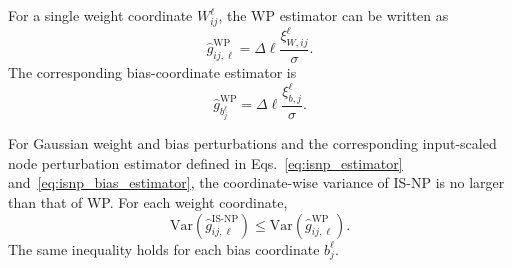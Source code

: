 For a single weight coordinate \(W^\ell_{ij}\), the WP estimator can be written as
\begin{equation}
\widehat{g}^{\mathrm{WP}}_{ij,\ell}
=
\Delta \ell
\frac{\xi^\ell_{W,ij}}{\sigma}.
\label{eq:wp_estimator_component}
\end{equation}
The corresponding bias-coordinate estimator is
\begin{equation}
\widehat{g}^{\mathrm{WP}}_{b_j^\ell}
=
\Delta \ell
\frac{\xi^\ell_{b,j}}{\sigma}.
\label{eq:wp_bias_estimator_component}
\end{equation}

\begin{theorem}
For Gaussian weight and bias perturbations and the corresponding input-scaled node perturbation estimator defined in Eqs.~\eqref{eq:isnp_estimator} and~\eqref{eq:isnp_bias_estimator}, the coordinate-wise variance of IS-NP is no larger than that of WP. For each weight coordinate,
\[
\mathrm{Var}\!\left(\widehat{g}^{\mathrm{IS\text{-}NP}}_{ij,\ell}\right)
\le
\mathrm{Var}\!\left(\widehat{g}^{\mathrm{WP}}_{ij,\ell}\right).
\]
The same inequality holds for each bias coordinate \(b_j^\ell\).
\end{theorem}

